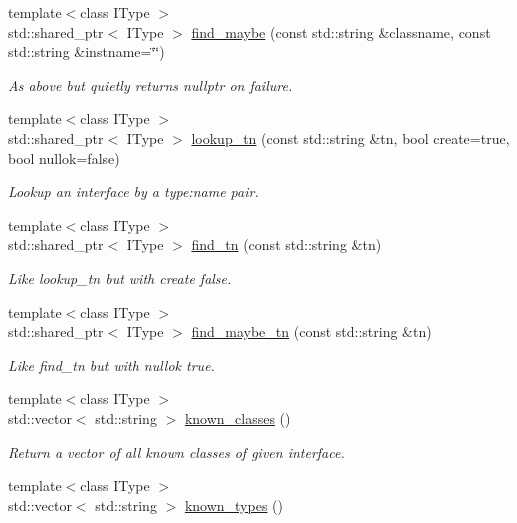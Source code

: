 \begin{DoxyCompactItemize}
\item 
{\footnotesize template$<$class I\+Type $>$ }\\std\+::shared\+\_\+ptr$<$ I\+Type $>$ \hyperlink{namespace_wire_cell_1_1_factory_adf719a75b0700dc095df9b9d27c32ede}{find\+\_\+maybe} (const std\+::string \&classname, const std\+::string \&instname=\char`\"{}\char`\"{})
\begin{DoxyCompactList}\small\item\em As above but quietly returns nullptr on failure. \end{DoxyCompactList}\item 
{\footnotesize template$<$class I\+Type $>$ }\\std\+::shared\+\_\+ptr$<$ I\+Type $>$ \hyperlink{namespace_wire_cell_1_1_factory_acde6688421b73bf10a0d26e77c9330c2}{lookup\+\_\+tn} (const std\+::string \&tn, bool create=true, bool nullok=false)
\begin{DoxyCompactList}\small\item\em Lookup an interface by a type\+:name pair. \end{DoxyCompactList}\item 
{\footnotesize template$<$class I\+Type $>$ }\\std\+::shared\+\_\+ptr$<$ I\+Type $>$ \hyperlink{namespace_wire_cell_1_1_factory_a19e5e02dfbb9f332865af3b41b3c302a}{find\+\_\+tn} (const std\+::string \&tn)
\begin{DoxyCompactList}\small\item\em Like lookup\+\_\+tn but with create false. \end{DoxyCompactList}\item 
{\footnotesize template$<$class I\+Type $>$ }\\std\+::shared\+\_\+ptr$<$ I\+Type $>$ \hyperlink{namespace_wire_cell_1_1_factory_a3ddc9d93fb9d5c5b32eeef3e996e52bd}{find\+\_\+maybe\+\_\+tn} (const std\+::string \&tn)
\begin{DoxyCompactList}\small\item\em Like find\+\_\+tn but with nullok true. \end{DoxyCompactList}\item 
{\footnotesize template$<$class I\+Type $>$ }\\std\+::vector$<$ std\+::string $>$ \hyperlink{namespace_wire_cell_1_1_factory_abfc39deedef2d6c44f0c9af364bcdd2d}{known\+\_\+classes} ()
\begin{DoxyCompactList}\small\item\em Return a vector of all known classes of given interface. \end{DoxyCompactList}\item 
{\footnotesize template$<$class I\+Type $>$ }\\std\+::vector$<$ std\+::string $>$ \hyperlink{namespace_wire_cell_1_1_factory_aedc58cf1d2d6c0e60586e95fd415f96e}{known\+\_\+types} ()
\end{DoxyCompactItemize}


